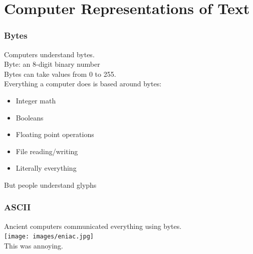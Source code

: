 \documentclass[smaller,xcolor=table,aspectratio=169]{beamer}
\begin{document}
						\section{Computer Representations of Text}

						\begin{frame}
							\frametitle{Bytes}
							Computers understand bytes.\\\pause{}
							Byte: an 8-digit binary number\\\pause{}
							Bytes can take values from 0 to 255.\\\pause{}
							Everything a computer does is based around bytes:\\\pause{}
							\begin{itemize}
								\item Integer math
								\item Booleans
								\item Floating point operations
								\item File reading/writing
								\item Literally everything
							\end{itemize}
							But people understand glyphs
						\end{frame}

						\begin{frame}
							\frametitle{ASCII}
							Ancient computers communicated everything using bytes.\\
							\texttt{[image: images/eniac.jpg]}\pause{}\\
							This was annoying.
						\end{frame}
\end{document}
